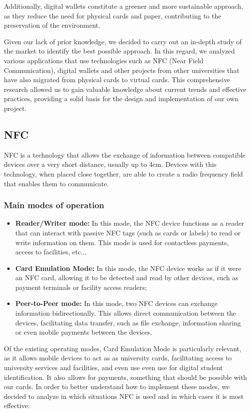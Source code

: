\documentclass[10pt]{article}
\begin{document}
Additionally, digital wallets constitute a greener and more sustainable approach, as they reduce the need for physical cards and paper, contributing to the preservation of the environment.

Given our lack of prior knowledge, we decided to carry out an in-depth study of the market to identify the best possible approach. In this regard, we analyzed various applications that use technologies such as NFC (Near Field Communication), digital wallets and other projects from other universities that have also migrated from physical cards to virtual cards. This comprehensive research allowed us to gain valuable knowledge about current trends and effective practices, providing a solid basis for the design and implementation of our own project.

\subsection{NFC}

NFC is a technology that allows the exchange of information between compatible devices over a very short distance, usually up to 4cm. Devices with this technology, when placed close together, are able to create a radio frequency field that enables them to communicate.

\subsubsection{Main modes of operation}
\begin{itemize}
    \item \textbf{Reader/Writer mode: } In this mode, the NFC device functions as a reader that can interact with passive NFC tags (such as cards or labels) to read or write information on them. This mode is used for contactless payments, access to facilities, etc...
    \item \textbf{Card Emulation Mode: } In this mode, the NFC device works as if it were an NFC card, allowing it to be detected and read by other devices, such as payment terminals or facility access readers;
    \item \textbf{Peer-to-Peer mode: } In this mode, two NFC devices can exchange information bidirectionally. This allows direct communication between the devices, facilitating data transfer, such as file exchange, information sharing or even mobile payments between the devices.
\end{itemize}

Of the existing operating modes, Card Emulation Mode is particularly relevant, as it allows mobile devices to act as
as university cards, facilitating access to university services and facilities, and even use
even use for digital student identification. It also allows for payments, something that should be possible with our cards.
In order to better understand how to implement these modes, we decided to analyze in which situations NFC is used and in which cases it is most effective:
\end{document}
